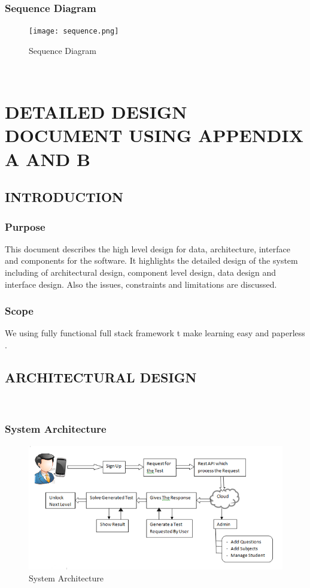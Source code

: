\documentclass[oneside,a4paper,12pt]{report}
\begin{document}
\subsection{Sequence Diagram}
\begin{figure}[!h]
\centering
\texttt{[image: sequence.png]}
\caption{Sequence Diagram}
\end{figure}
\\

\chapter{DETAILED DESIGN DOCUMENT USING APPENDIX A AND B}
\newpage
\section{INTRODUCTION}

\subsection{Purpose}
\hspace*{0.3in}This document describes the high level design for data, architecture, interface and components for the software. It highlights the detailed design of the system including of architectural design, component level design, data design and interface design. Also the issues, constraints and limitations are discussed.\\

\subsection{Scope}
\hspace*{0.3in}We using fully functional full stack framework t make learning easy and paperless  .

\section{ARCHITECTURAL DESIGN}
\\
\subsection{System Architecture}

\begin{figure}[!h]
\centering
\includegraphics[height=6 cm,width=10 cm]{arch.png}
\caption{System Architecture}
\end{figure}
\end{document}
